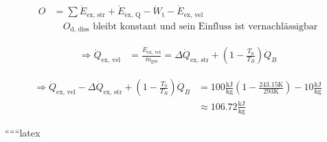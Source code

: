\begin{align*}
O &= \sum \dot{E}_{\text{ex, str}} + \dot{E}_{\text{ex, Q}} - \dot{W}_{\text{t}} - \dot{E}_{\text{ex, vel}} \\
&\quad O_{\text{d, diss}} \text{ bleibt konstant und sein Einfluss ist vernachlässigbar}
\end{align*}

\begin{align*}
\Rightarrow \dot{Q}_{\text{ex, vel}} &= \frac{E_{\text{ex, vel}}}{\dot{m}_{\text{ges}}} = \Delta \dot{Q}_{\text{ex, str}} + \left(1 - \frac{T_0}{T_B}\right) \dot{Q}_B
\end{align*}

\begin{align*}
\Rightarrow \dot{Q}_{\text{ex, vel}} - \Delta \dot{Q}_{\text{ex, str}} + \left(1 - \frac{T_0}{T_B}\right) \dot{Q}_B &= 100 \frac{\text{kJ}}{\text{kg}} \left(1 - \frac{243.15 \text{K}}{293 \text{K}}\right) - 10 \frac{\text{kJ}}{\text{kg}} \\
&\approx 106.72 \frac{\text{kJ}}{\text{kg}}
\end{align*}

``````latex


